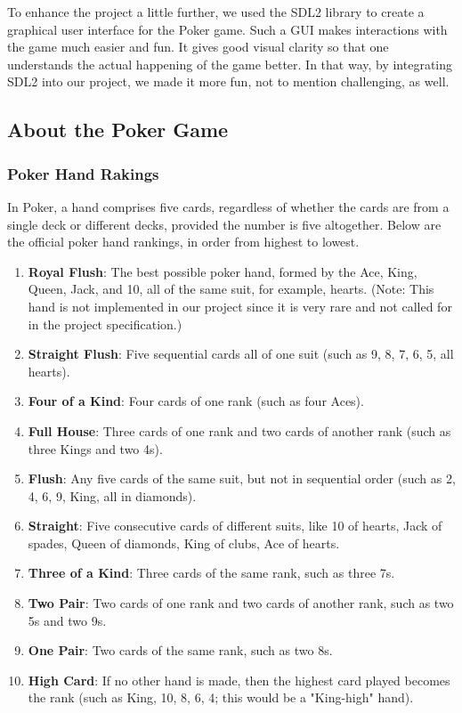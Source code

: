 \vspace{0.5cm}

\hspace{1cm} To enhance the project a little further, we used the SDL2 library to create a graphical user interface for the Poker game. Such a GUI makes interactions with the game much easier and fun. It gives good visual clarity so that one understands the actual happening of the game better. In that way, by integrating SDL2 into our project, we made it more fun, not to mention challenging, as well.

\subsection{About the Poker Game}
\label{subsec:about-the-poker-game}

\subsubsection{Poker Hand Rakings}
\label{subsubsec:poker-hand-rankings}
\hspace{1cm} In Poker, a hand comprises five cards, regardless of whether the cards are from a single deck or different decks, provided the number is five altogether. Below are the official poker hand rankings, in order from highest to lowest.

\begin{enumerate}
    \item \textbf{Royal Flush}: The best possible poker hand, formed by the Ace, King, Queen, Jack, and 10, all of the same suit, for example, hearts. (Note: This hand is not implemented in our project since it is very rare and not called for in the project specification.)
    \item \textbf{Straight Flush}: Five sequential cards all of one suit (such as 9, 8, 7, 6, 5, all hearts).
    \item \textbf{Four of a Kind}: Four cards of one rank (such as four Aces).
    \item \textbf{Full House}: Three cards of one rank and two cards of another rank (such as three Kings and two 4s).
    \item \textbf{Flush}: Any five cards of the same suit, but not in sequential order (such as 2, 4, 6, 9, King, all in diamonds).
    \item \textbf{Straight}: Five consecutive cards of different suits, like 10 of hearts, Jack of spades, Queen of diamonds, King of clubs, Ace of hearts.
    \item \textbf{Three of a Kind}: Three cards of the same rank, such as three 7s.
    \item \textbf{Two Pair}: Two cards of one rank and two cards of another rank, such as two 5s and two 9s.
    \item \textbf{One Pair}: Two cards of the same rank, such as two 8s.
    \item \textbf{High Card}: If no other hand is made, then the highest card played becomes the rank (such as King, 10, 8, 6, 4; this would be a "King-high" hand).
\end{enumerate}

